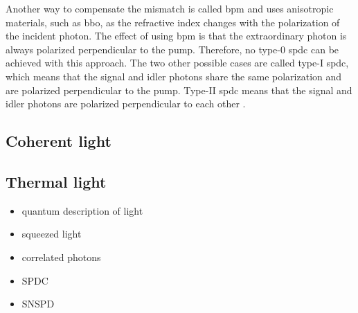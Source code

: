 Another way to compensate the mismatch is called \acrfull{bpm} and uses anisotropic materials, such as \acrshort{bbo}, as the refractive index changes with the polarization of the incident photon. The effect of using \acrshort{bpm} is that the extraordinary photon is always polarized perpendicular to the pump. Therefore, no type-0 \acrshort{spdc} can be achieved with this approach. The two other possible cases are called type-I \acrshort{spdc}, which means that the signal and idler photons share the same polarization and are polarized perpendicular to the pump. Type-II \acrshort{spdc} means that the signal and idler photons are polarized perpendicular to each other \cite{boydNonlinearOptics2008}. 

 
\subsection{Coherent light}
\subsection{Thermal light}
\begin{itemize}
    \item quantum description of light
    \item squeezed light
    \item correlated photons
    \item SPDC
    \item SNSPD
\end{itemize}

